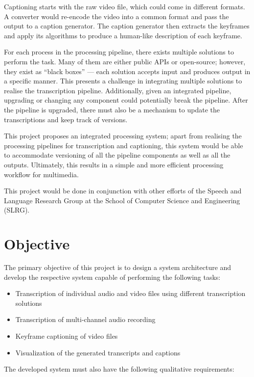 Captioning starts with the raw video file, which could come in different formats.
A converter would re-encode the video into a common format and pass the output
to a caption generator. The caption generator then extracts the keyframes and
apply its algorithms to produce a human-like description of each keyframe.

For each process in the processing pipeline, there exists multiple solutions
to perform the task. Many of them are either public APIs
or open-source; however, they exist as ``black boxes'' --- each solution accepts
input and produces output in a specific manner. This presents a challenge in
integrating multiple solutions to realise the transcription pipeline.
Additionally, given an integrated pipeline, upgrading or changing any component
could potentially break the pipeline. After the pipeline is upgraded, there must
also be a mechanism to update the transcriptions and keep track of versions. 

This project proposes an integrated processing system; apart from realising
the processing pipelines for transcription and captioning, this system would be
able to accommodate versioning
of all the pipeline components as well as all the outputs. Ultimately, this
results in a simple and more efficient processing workflow for multimedia.

This project would be done in conjunction with other efforts of the Speech and
Language Research Group at the School of Computer Science and Engineering
(SLRG)\cite{slrg}.

\section{Objective}

The primary objective of this project is to design a system architecture and
develop the respective system capable of performing the following tasks:

\begin{itemize}
    \item Transcription of individual audio and video files using different
    transcription solutions
    \item Transcription of multi-channel audio recording
    \item Keyframe captioning of video files
    \item Visualization of the generated transcripts and captions
\end{itemize}

The developed system must also have the following qualitative requirements:

